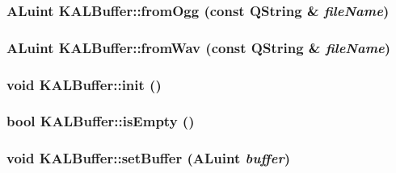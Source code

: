 \hypertarget{class_k_a_l_buffer_151a3351cd7c10bea0ff78f78272b794}{
\subsubsection[{fromOgg}]{\setlength{\rightskip}{0pt plus 5cm}ALuint KALBuffer::fromOgg (const QString \& {\em fileName})}}
\label{class_k_a_l_buffer_151a3351cd7c10bea0ff78f78272b794}


\hypertarget{class_k_a_l_buffer_5ac5acdd54b7290392641712b57d4c5f}{
\subsubsection[{fromWav}]{\setlength{\rightskip}{0pt plus 5cm}ALuint KALBuffer::fromWav (const QString \& {\em fileName})}}
\label{class_k_a_l_buffer_5ac5acdd54b7290392641712b57d4c5f}


\hypertarget{class_k_a_l_buffer_92e4bff6c8b3fa4d30621ccd8a6a5dd2}{
\subsubsection[{init}]{\setlength{\rightskip}{0pt plus 5cm}void KALBuffer::init ()}}
\label{class_k_a_l_buffer_92e4bff6c8b3fa4d30621ccd8a6a5dd2}


\hypertarget{class_k_a_l_buffer_c415516ab1e3e4cd4e548f368e0c22ac}{
\subsubsection[{isEmpty}]{\setlength{\rightskip}{0pt plus 5cm}bool KALBuffer::isEmpty ()}}
\label{class_k_a_l_buffer_c415516ab1e3e4cd4e548f368e0c22ac}


\hypertarget{class_k_a_l_buffer_2029fa8a9f9b5711c10f647336b721bd}{
\subsubsection[{setBuffer}]{\setlength{\rightskip}{0pt plus 5cm}void KALBuffer::setBuffer (ALuint {\em buffer})}}
\label{class_k_a_l_buffer_2029fa8a9f9b5711c10f647336b721bd}


